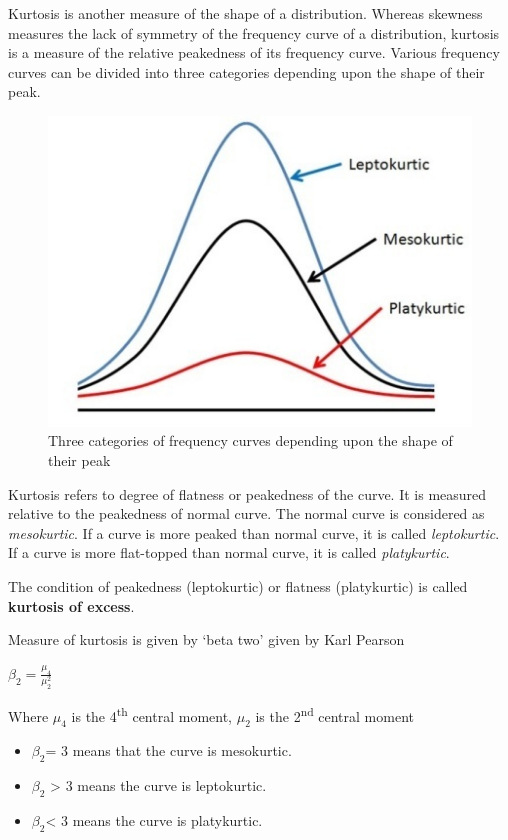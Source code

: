 \documentclass[
]{book}
\begin{document}
Kurtosis is another measure of the shape of a distribution. Whereas
skewness measures the lack of symmetry of the frequency curve of a
distribution, kurtosis is a measure of the relative peakedness of its
frequency curve. Various frequency curves can be divided into three
categories depending upon the shape of their peak.

\begin{figure}

{\centering \includegraphics[width=0.5\linewidth]{images/image10_5} 

}

\caption{Three categories of frequency curves depending upon the shape of their peak}\label{fig:k1}
\end{figure}

Kurtosis refers to degree of flatness or peakedness of the curve. It is
measured relative to the peakedness of normal curve. The normal curve is considered as \emph{mesokurtic}. If a curve is
more peaked than normal curve, it is called \emph{leptokurtic}. If a curve is
more flat-topped than normal curve, it is called \emph{platykurtic}.

The condition of peakedness (leptokurtic) or flatness (platykurtic) is
called \textbf{kurtosis of excess}.

Measure of kurtosis is given by `beta two' given by Karl Pearson

\(\beta_{2} = \frac{\mu_{4}}{\mu_{2}^{2}}\)

Where \(\mu_{4}\) is the 4\textsuperscript{th} central moment, \(\mu_{2}\) is the 2\textsuperscript{nd}
central moment

\begin{itemize}
\item
  \(\beta_{2}\)= 3 means that the curve is mesokurtic.
\item
  \(\beta_{2}\) \textgreater{} 3 means the curve is leptokurtic.
\item
  \(\beta_{2}\)\textless{} 3 means the curve is platykurtic.
\end{itemize}
\end{document}
